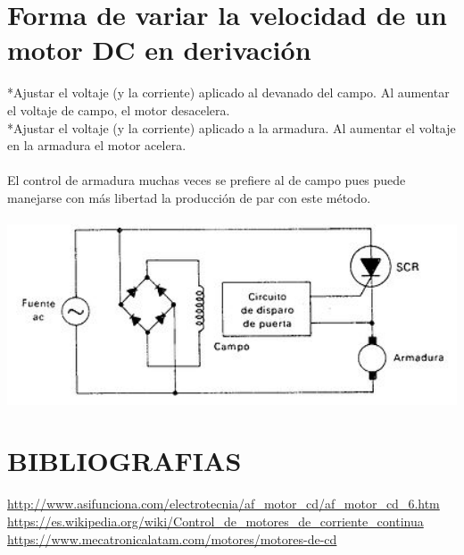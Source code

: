 \documentclass[12pt,a4paper]{article}
\begin{document}
\section{Forma de variar la velocidad de un motor DC en derivaci\'on}
*Ajustar el voltaje (y la corriente) aplicado al devanado del campo. Al aumentar el voltaje de campo, el motor desacelera.\\
*Ajustar el voltaje (y la corriente) aplicado a la armadura. Al aumentar el voltaje en la armadura el motor acelera.\\
\\
El control de armadura muchas veces se prefiere al de campo pues puede manejarse con más libertad la producci\'on de par con este m\'etodo.\\
\\
\includegraphics[width=15cm]{controlador_1.jpg}
\\
\section{BIBLIOGRAFIAS}
\url{http://www.asifunciona.com/electrotecnia/af_motor_cd/af_motor_cd_6.htm}
\\
\url{https://es.wikipedia.org/wiki/Control_de_motores_de_corriente_continua}
\\
\url{https://www.mecatronicalatam.com/motores/motores-de-cd}
\end{document}
